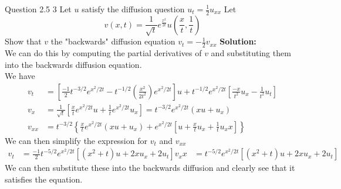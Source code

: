 \documentclass[answers,12pt,addpoints]{exam}
\begin{document}
\begin{questions}
    \question Question 2.5 3
    Let $u$ satisfy the diffusion question $u_t = \frac{1}{2}u_{xx}$ Let
    $$v(x,t) = \frac{1}{\sqrt{t}}e^{\frac{x^2}{2t}}u(\frac{x}{t}, \frac{1}{t}) $$
    Show that $v$ the "backwards" diffusion equation $v_t = -\frac{1}{2}v_{xx}$
    \textbf{Solution:}\\
    We can do this by computing the partial derivatives of $v$ and substituting them into the backwards diffusion equation.\\
    We have
    \begin{align*}
        v_t &= \left[\frac{-1}{2}t^{-3/2} e^{x^2 /2t} - t^{-1/2}\left( \frac{x^2}{2t^2}\right)e^{x^2 / 2t} \right]u + t^{-1/2}e^{x^2 / 2t}\left[ \frac{-x}{t^2}u_x - \frac{1}{t^2}u_t \right]\\
        v_x &= \frac{1}{\sqrt{t}} \left[ \frac{x}{t}e^{x^2 / 2t}u + \frac{1}{t} e^{x^2 / 2t}u_x \right] = t^{-3/2}e^{x^2 / 2t}(xu + u_x)\\
        v_{xx} &= t^{-3/2} \left\{ \frac{x}{t} e^{x^2 / 2t} (xu + u_x) + e^{x^2 / 2t}\left[u + \frac{x}{t}u_x + \frac{1}{t}u_xx \right]  \right\}
    \end{align*}
    We can then simplify the expression for $v_t$ and $v_{xx}$ 
    \begin{align*}
        v_t &= \frac{-1}{2}t^{-5/2}e^{x^2 / 2t}\left[ (x^2 + t)u + 2xu_x + 2u_t \right] 
        v_xx &= t^{-5/2} e^{x^2 / 2t} \left[ (x^2 + t)u + 2xu_x + 2u_t \right]
    \end{align*}
    We can then substitute these into the backwards diffusion and clearly see that it satisfies the equation.\\


\end{questions}
\end{document}
